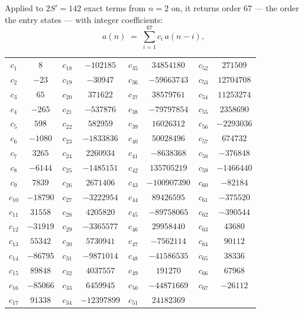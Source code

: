 \documentclass[11pt,a4paper]{article}
\theoremstyle{plain}
\theoremstyle{definition}
\begin{document}
Applied to $2S'=142$ exact terms from $n=2$ on, it returns order $67$ --- the
order the entry states --- with integer coefficients:
\[
a(n)\;=\;\sum_{i=1}^{67}c_i\,a(n-i),
\]
\begin{center}\small
\begin{tabular}{cccccccc}
$c_{1}$ & $8$ & $c_{18}$ & $-102185$ & $c_{35}$ & $34854180$ & $c_{52}$ & $271509$ \\
$c_{2}$ & $-23$ & $c_{19}$ & $-30947$ & $c_{36}$ & $-59663743$ & $c_{53}$ & $12704708$ \\
$c_{3}$ & $65$ & $c_{20}$ & $371622$ & $c_{37}$ & $38579761$ & $c_{54}$ & $11253274$ \\
$c_{4}$ & $-265$ & $c_{21}$ & $-537876$ & $c_{38}$ & $-79797854$ & $c_{55}$ & $2358690$ \\
$c_{5}$ & $598$ & $c_{22}$ & $582959$ & $c_{39}$ & $16026312$ & $c_{56}$ & $-2293036$ \\
$c_{6}$ & $-1080$ & $c_{23}$ & $-1833836$ & $c_{40}$ & $50028496$ & $c_{57}$ & $674732$ \\
$c_{7}$ & $3265$ & $c_{24}$ & $2260934$ & $c_{41}$ & $-8638368$ & $c_{58}$ & $-376848$ \\
$c_{8}$ & $-6144$ & $c_{25}$ & $-1485151$ & $c_{42}$ & $135705219$ & $c_{59}$ & $-1466440$ \\
$c_{9}$ & $7839$ & $c_{26}$ & $2671406$ & $c_{43}$ & $-100907390$ & $c_{60}$ & $-82184$ \\
$c_{10}$ & $-18790$ & $c_{27}$ & $-3222954$ & $c_{44}$ & $89426595$ & $c_{61}$ & $-375520$ \\
$c_{11}$ & $31558$ & $c_{28}$ & $4205820$ & $c_{45}$ & $-89758065$ & $c_{62}$ & $-390544$ \\
$c_{12}$ & $-31919$ & $c_{29}$ & $-3365577$ & $c_{46}$ & $29958440$ & $c_{63}$ & $43680$ \\
$c_{13}$ & $55342$ & $c_{30}$ & $5730941$ & $c_{47}$ & $-7562114$ & $c_{64}$ & $90112$ \\
$c_{14}$ & $-86795$ & $c_{31}$ & $-9871014$ & $c_{48}$ & $-41586535$ & $c_{65}$ & $38336$ \\
$c_{15}$ & $89848$ & $c_{32}$ & $4037557$ & $c_{49}$ & $191270$ & $c_{66}$ & $67968$ \\
$c_{16}$ & $-85066$ & $c_{33}$ & $6459945$ & $c_{50}$ & $-44871669$ & $c_{67}$ & $-26112$ \\
$c_{17}$ & $91338$ & $c_{34}$ & $-12397899$ & $c_{51}$ & $24182369$ &  &  \\
\end{tabular}
\end{center}
\end{document}
